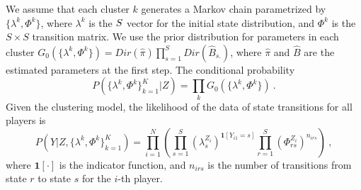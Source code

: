 We assume that each cluster $k$ generates a Markov chain parametrized by $\{\lambda^k, \Phi^k\}$, 
where $\lambda^k$ is the $S\time 1$ vector for the initial state distribution, 
and $\Phi^k$ is the $S \times S$ transition matrix. We use the prior distribution 
for parameters in each cluster $G_0(\{\lambda^k, \Phi^k\}) = Dir(\hat\pi) \prod_{s=1}^S Dir (\hat B_{s.})$,
where $\hat\pi$ and $\hat B$ are the estimated parameters at the first step. 
The conditional probability  
\begin{equation}
\label{eq:condi}
  P(\{\lambda^k, \Phi^k \}_{k=1}^K | Z ) 
= \prod_k G_0(\{\lambda^k, \Phi^k\})~.
\end{equation}
Given the clustering model, the likelihood of the data of state transitions for all players is
\begin{equation}
\label{eq:likeli}
  P(Y| Z, \{\lambda^k, \Phi^k \}_{k=1}^K) 
= \prod_{i=1}^N \left( \prod_{s=1}^S (\lambda_s^{Z_i})^{\mathbf{1}[Y_{i1} = s]} \prod_{r=1}^S \left(\Phi_{rs}^{Z_i}\right)^{n_{irs}} \right)~,
\end{equation}
where $\mathbf{1} [\cdot]$ is the indicator function, and $n_{irs}$ is the number of transitions from state $r$ to state $s$ for the $i$-th player.

